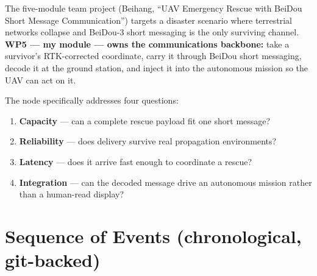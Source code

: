 \documentclass[11pt,a4paper]{article}
\begin{document}
The five-module team project (Beihang, ``UAV Emergency Rescue with BeiDou Short Message
Communication'') targets a disaster scenario where terrestrial networks collapse and
BeiDou-3 short messaging is the only surviving channel. \textbf{WP5 --- my module --- owns
the communications backbone:} take a survivor's RTK-corrected coordinate, carry it through
BeiDou short messaging, decode it at the ground station, and inject it into the autonomous
mission so the UAV can act on it.

The node specifically addresses four questions:
\begin{enumerate}[leftmargin=1.6em,itemsep=1pt]
  \item \textbf{Capacity} --- can a complete rescue payload fit one short message?
  \item \textbf{Reliability} --- does delivery survive real propagation environments?
  \item \textbf{Latency} --- does it arrive fast enough to coordinate a rescue?
  \item \textbf{Integration} --- can the decoded message drive an autonomous mission rather
        than a human-read display?
\end{enumerate}

\section{Sequence of Events (chronological, git-backed)}
\end{document}
